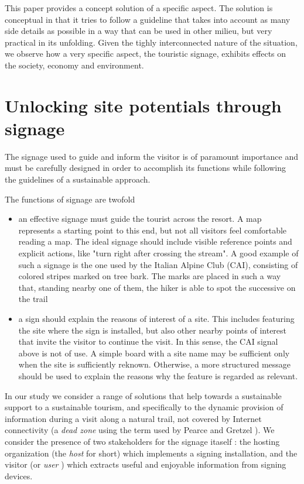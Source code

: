 \documentclass[sustainability,article,submit,pdftex,moreauthors]{Definitions/mdpi}
\begin{document}
This paper provides a concept solution of a specific aspect. The solution is conceptual in that it tries to follow a guideline that takes into account as many side details as possible in a way that can be used in other milieu, but very practical in its unfolding. Given the tighly interconnected nature of the situation, we observe how a very specific aspect, the touristic signage, exhibits effects on the society, economy and environment.

\section{Unlocking site potentials through signage}

The signage used to guide and inform the visitor is of paramount importance and must be carefully designed in order to accomplish its functions while following the guidelines of a sustainable approach.

The functions of signage are twofold
\begin {itemize}
\item an effective signage must guide the tourist across the resort. A map represents a starting point to this end, but not all visitors feel comfortable reading a map. The ideal signage should include visible reference points and explicit actions, like "turn right after crossing the stream". A good example of such a signage is the one used by the Italian Alpine Club (CAI), consisting of colored stripes marked on tree bark. The marks are placed in such a way that, standing nearby one of them, the hiker is able to spot the successive on the trail
\item a sign should explain the reasons of interest of a site. This includes featuring the site where the sign is installed, but also other nearby points of interest that invite the visitor to continue the visit. In this sense, the CAI signal above is not of use. A simple board with a site name may be sufficient only when the site is sufficiently reknown. Otherwise, a more structured message should be used to explain the reasons why the feature is regarded as relevant.
\end{itemize}

In our study we consider a range of solutions that help towards a sustainable support to a sustainable tourism, and specifically to the dynamic provision of information during a visit along a natural trail, not covered by Internet connectivity (a {\em dead zone} using the term used by Pearce and Gretzel \cite{pea12a}). We consider the presence of two stakeholders for the signage itaself \cite{wan22a}: the hosting organization (the {\em host} for short) which implements a signing installation, and the visitor (or {\em user} ) which extracts useful and enjoyable information from signing devices. 
\end{document}
